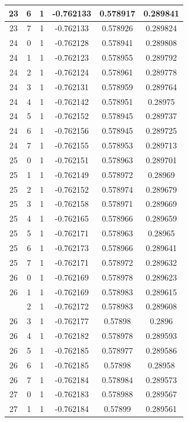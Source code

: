 \documentclass[12pt,a4paper]{article}
\numberwithin{equation}{section}
\numberwithin{figure}{section}
\numberwithin{table}{section}
\begin{document}
\begin{longtable}{|c|c|c|c|c|c|}
23 & 6 & 1 & -0.762133 & 0.578917 & 0.289841 \\ \hline
23 & 7 & 1 & -0.762133 & 0.578926 & 0.289824 \\ \hline
24 & 0 & 1 & -0.762128 & 0.578941 & 0.289808 \\ \hline
24 & 1 & 1 & -0.762123 & 0.578955 & 0.289792 \\ \hline
24 & 2 & 1 & -0.762124 & 0.578961 & 0.289778 \\ \hline
24 & 3 & 1 & -0.762131 & 0.578959 & 0.289764 \\ \hline
24 & 4 & 1 & -0.762142 & 0.578951 & 0.28975 \\ \hline
24 & 5 & 1 & -0.762152 & 0.578945 & 0.289737 \\ \hline
24 & 6 & 1 & -0.762156 & 0.578945 & 0.289725 \\ \hline
24 & 7 & 1 & -0.762155 & 0.578953 & 0.289713 \\ \hline
25 & 0 & 1 & -0.762151 & 0.578963 & 0.289701 \\ \hline
25 & 1 & 1 & -0.762149 & 0.578972 & 0.28969 \\ \hline
25 & 2 & 1 & -0.762152 & 0.578974 & 0.289679 \\ \hline
25 & 3 & 1 & -0.762158 & 0.578971 & 0.289669 \\ \hline
25 & 4 & 1 & -0.762165 & 0.578966 & 0.289659 \\ \hline
25 & 5 & 1 & -0.762171 & 0.578963 & 0.28965 \\ \hline
25 & 6 & 1 & -0.762173 & 0.578966 & 0.289641 \\ \hline
25 & 7 & 1 & -0.762171 & 0.578972 & 0.289632 \\ \hline
26 & 0 & 1 & -0.762169 & 0.578978 & 0.289623 \\ \hline
26 & 1 & 1 & -0.762169 & 0.578983 & 0.289615 \\ \hline
\pagebreak
26 & 2 & 1 & -0.762172 & 0.578983 & 0.289608 \\ \hline
26 & 3 & 1 & -0.762177 & 0.57898 & 0.2896 \\ \hline
26 & 4 & 1 & -0.762182 & 0.578978 & 0.289593 \\ \hline
26 & 5 & 1 & -0.762185 & 0.578977 & 0.289586 \\ \hline
26 & 6 & 1 & -0.762185 & 0.57898 & 0.28958 \\ \hline
26 & 7 & 1 & -0.762184 & 0.578984 & 0.289573 \\ \hline
27 & 0 & 1 & -0.762183 & 0.578988 & 0.289567 \\ \hline
27 & 1 & 1 & -0.762184 & 0.57899 & 0.289561 \\ \hline

\end{longtable}
\end{document}
